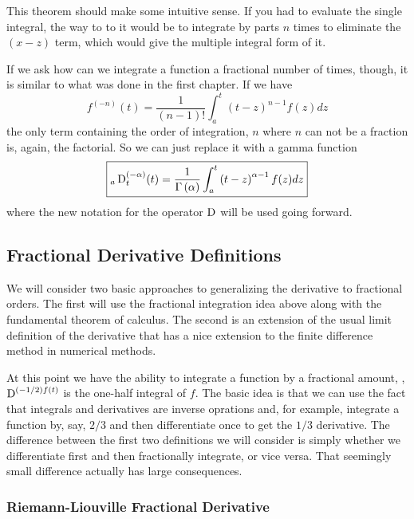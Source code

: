 This theorem should make some intuitive sense. If you had to evaluate the single integral, the way to to it would be to integrate by parts $n$ times to eliminate the $(x - z)$ term, which would give the multiple integral form of it.

If we ask how can we integrate a function a fractional number of times, though, it is similar to what was done in the first chapter. If we have
\begin{equation*}
  f^{(-n)}(t) = \frac{1}{\left( n - 1 \right)!} \int_a^t \left( t - z \right)^{n-1} f(z) dz
\end{equation*}
the only term containing the order of integration, $n$ where $n$ can not be a fraction is, again, the factorial. So we can just replace it with a gamma function 
\begin{equation}
  \boxed{ _a\operatorname{D}^{(-\alpha)}_t(t) = \frac{1}{\Gamma \left( \alpha \right)} \int_a^t \left( t - z \right)^{\alpha-1} f(z) dz }
  \label{eq:fracint}
\end{equation}
where the new notation for the operator $\operatorname{D}$ will be used going forward. 

\subsection{Fractional Derivative Definitions}

We will consider two basic approaches to generalizing the derivative to fractional orders. The first will use the fractional integration idea above along with the fundamental theorem of calculus. The second is an extension of the usual limit definition of the derivative that has a nice extension to the finite difference method in numerical methods.

At this point we have the ability to integrate a function by a fractional amount, \eg, $\operatorname{D}^{\left( -1/2 \right)f(t)}$ is the one-half integral of $f$. The basic idea is that we can use the fact that integrals and derivatives are inverse oprations and, for example, integrate a function by, say, $2/3$ and then differentiate once to get the $1/3$ derivative. The difference between the first two definitions we will consider is simply whether we differentiate first and then fractionally integrate, or vice versa. That seemingly small difference actually has large consequences.

\subsubsection{Riemann-Liouville Fractional Derivative}

